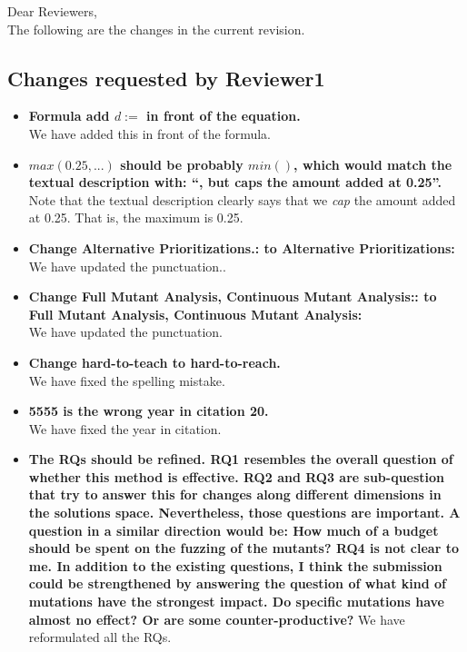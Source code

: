 \documentclass[11pt]{article}
\begin{document}
\noindent{}Dear Reviewers, \\
The following are the changes in the current revision.

\subsection*{Changes requested by Reviewer1}
\begin{itemize}
\item \textbf{Formula add $d:=$ in front of the equation.} \\
We have added this in front of the formula.

\item \textbf{$max(0.25, ...)$ should be probably $min()$, which would match the
textual description with: ``, but caps the amount added at 0.25''.}\\
Note that the textual description clearly says that we \emph{cap} the amount
added at 0.25. That is, the maximum is 0.25.
\item \textbf{Change Alternative Prioritizations.: to Alternative
Prioritizations:}\\
We have updated the punctuation..

\item \textbf{Change Full Mutant Analysis, Continuous Mutant Analysis:: to Full Mutant
Analysis, Continuous Mutant Analysis:}\\
We have updated the punctuation.

\item \textbf{Change hard-to-teach to hard-to-reach.}\\
We have fixed the spelling mistake.

\item \textbf{5555 is the wrong year in citation 20.}\\
We have fixed the year in citation.

\item \textbf{
The RQs should be refined. RQ1 resembles the overall question of whether this
method is effective. RQ2 and RQ3 are sub-question that try to answer this for
changes along different dimensions in the solutions space. Nevertheless, those
questions are important. A question in a similar direction would be: How much of
a budget should be spent on the fuzzing of the mutants?
RQ4 is not clear to me.
In addition to the existing questions, I think the submission could be
strengthened by answering the question of what kind of mutations have the
strongest impact. Do specific mutations have almost no effect? Or are some
counter-productive?
}
We have reformulated all the RQs.


\end{itemize}
\end{document}
